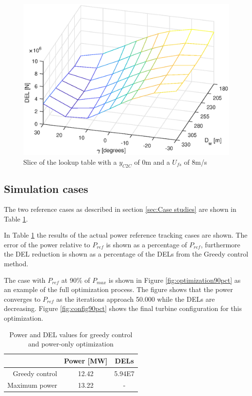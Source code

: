\begin{figure}
	\includegraphics[width=\linewidth]{./Figures/LUTslice_yWake0_Ufs8.eps}
	\caption{Slice of the lookup table with a $y_{C2C}$ of 0m and a $U_{fs}$ of 8m/s }
	\label{fig:LUTsliceDw}
\end{figure}

\subsection{Simulation cases} \label{sec:Simulation cases}
The two reference cases as described in section \ref{sec:Case studies} are shown in Table \ref{tab:reference results}. 

In Table \ref{tab:reference results} the results of the actual power reference tracking cases are shown. The error of the power relative to $P_{ref}$ is shown as a percentage of $P_{ref}$, furthermore the DEL reduction is shown as a percentage of the DELs from the Greedy control method. 

The case with $P_{ref}$ at 90\% of $P_{max}$ is shown in Figure \ref{fig:optimization90pct} as an example of the full optimization process. The figure shows that the power converges to $P_{ref}$ as the iterations approach 50.000 while the DELs are decreasing. Figure \ref{fig:config90pct} shows the final turbine configuration for this optimization. 

\begin{table}[p]
	\caption{Power and DEL values for greedy control and power-only optimization}
	\centering
	\label{tab:reference results}
	\begin{tabular}{rcc}
		\hline
		& Power [MW] & DELs \\ 
		\hline
		Greedy control & 12.42 & 5.94E7 \\
		Maximum power & 13.22 & - \\
	\end{tabular}
\end{table}

